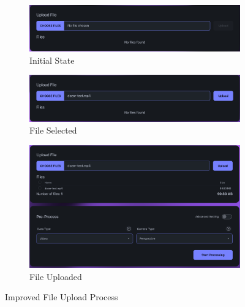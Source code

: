 \begin{figure}[htb]
  \begin{subfigure}{\textwidth}
    \centering
    \includegraphics[width=.8\linewidth]{figures/fix-4.1.png}
    \caption{Initial State}
  \end{subfigure}
  \begin{subfigure}{\textwidth}
    \centering
    \includegraphics[width=.8\linewidth]{figures/fix-4.2.png}
    \caption{File Selected}
  \end{subfigure}
  \begin{subfigure}{\textwidth}
    \centering
    \includegraphics[width=.8\linewidth]{figures/fix-4.3.png}
    \caption{File Uploaded}
  \end{subfigure}
	\caption{Improved File Upload Process}
  \label{fig:fix-4}
\end{figure}
